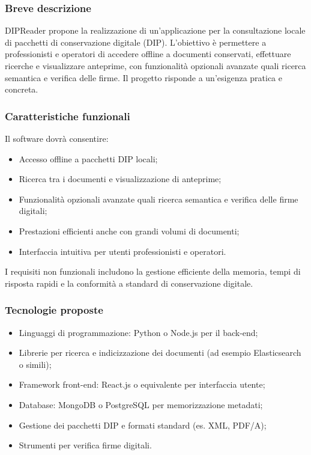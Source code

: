\documentclass[a4paper,11pt]{article}
\begin{document}
\subsubsection{Breve descrizione}
DIPReader propone la realizzazione di un'applicazione per la consultazione locale di pacchetti di conservazione digitale (DIP). L'obiettivo è permettere a professionisti e operatori di accedere offline a documenti conservati, effettuare ricerche e visualizzare anteprime, con funzionalità opzionali avanzate quali ricerca semantica e verifica delle firme. Il progetto risponde a un'esigenza pratica e concreta.

\subsubsection{Caratteristiche funzionali}
Il software dovrà consentire:
\begin{itemize}[leftmargin=*]
  \item Accesso offline a pacchetti DIP locali;
  \item Ricerca tra i documenti e visualizzazione di anteprime;
  \item Funzionalità opzionali avanzate quali ricerca semantica e verifica delle firme digitali;
  \item Prestazioni efficienti anche con grandi volumi di documenti;
  \item Interfaccia intuitiva per utenti professionisti e operatori.
\end{itemize}
I requisiti non funzionali includono la gestione efficiente della memoria, tempi di risposta rapidi e la conformità a standard di conservazione digitale.

\subsubsection{Tecnologie proposte}
\begin{itemize}[leftmargin=*]
  \item Linguaggi di programmazione: Python o Node.js per il back-end;
  \item Librerie per ricerca e indicizzazione dei documenti (ad esempio Elasticsearch o simili);
  \item Framework front-end: React.js o equivalente per interfaccia utente;
  \item Database: MongoDB o PostgreSQL per memorizzazione metadati;
  \item Gestione dei pacchetti DIP e formati standard (es. XML, PDF/A);
  \item Strumenti per verifica firme digitali.
\end{itemize}
\end{document}
